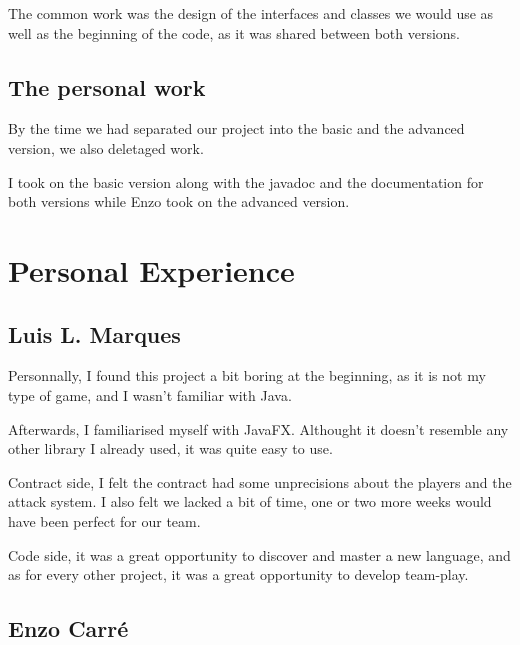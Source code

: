 \documentclass[12pt, a4paper]{report}
\begin{document}
The common work was the design of the interfaces and classes we would use as well as the beginning of the code, as it was shared between both versions.

\subsection*{The personal work}

By the time we had separated our project into the basic and the advanced version, we also deletaged work.

I took on the basic version along with the javadoc and the documentation for both versions while Enzo took on the advanced version.

\section*{Personal Experience}

\subsection*{Luis L. Marques}

Personnally, I found this project a bit boring at the beginning, as it is not my type of game, and I wasn't familiar with Java.

Afterwards, I familiarised myself with JavaFX. Althought it doesn't resemble any other library I already used, it was quite easy to use.

Contract side, I felt the contract had some unprecisions about the players and the attack system. I also felt we lacked a bit of time, one or two more weeks would have been perfect for our team.

Code side, it was a great opportunity to discover and master a new language, and as for every other project, it was a great opportunity to develop team-play.

\subsection*{Enzo Carré}
\end{document}
